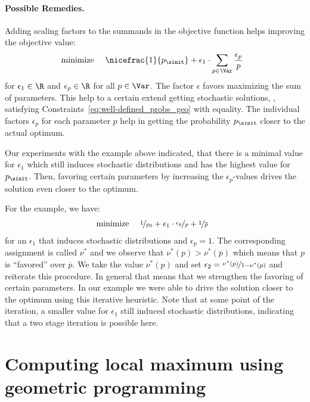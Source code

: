 
\paragraph{Possible Remedies.}
Adding scaling factors to the summands in the objective function helps improving the objective value:
\begin{align}
			\text{ minimize } &\quad \nicefrac{1}{p_{\sinit}} + \epsilon_1\cdot\sum_{p\in\Var}\frac{\epsilon_p}{p}\label{eq:min_geo_relax1}
\end{align}
for $\epsilon_1\in\R$ and $\epsilon_p\in\R$ for all $p\in\Var$. The factor $\epsilon$ favors maximizing the sum of parameters. This help to a certain extend getting stochastic solutions, \ie, satisfying Constraints~\ref{eq:well-defined_probs_geo} with equality. The individual factors $\epsilon_p$ for each parameter $p$ help in getting the probability $p_{\sinit}$ closer to the actual optimum.

Our experiments with the example above indicated, that there is a minimal value for $\epsilon_1$ which still induces stochastic distributions and has the highest value for $p_{\sinit}$. Then, favoring certain parameters by increasing the $\epsilon_p$-values drives the solution even closer to the optimum. 

For the example, we have:
\begin{align}
			\text{ minimize } &\quad \nicefrac{1}{p_{0}} + \epsilon_1\cdot \nicefrac{\epsilon_p}{p} + \nicefrac{1}{\overline p}
\end{align}
for an $\epsilon_1$ that induces stochastic distributions and $\epsilon_p=1$. The corresponding assignment is called $\nu^*$ and we observe that $\nu^*(p)>\nu^*(\overline p)$ which means that $p$ is ``favored'' over $\overline p$. We take the value $\nu^*(p)$ and set $\epsilon_2=\nicefrac{\nu^*(p)}{1-\nu^*(p)}$ and reiterate this procedure. In general that means that we strengthen the favoring of certain parameters. In our example we were able to drive the solution closer to the optimum using this iterative heuristic. Note that at some point of the iteration, a smaller value for $\epsilon_1$ still induced stochastic distributions, indicating that a two stage iteration is possible here.


\section{Computing local maximum using geometric programming}

